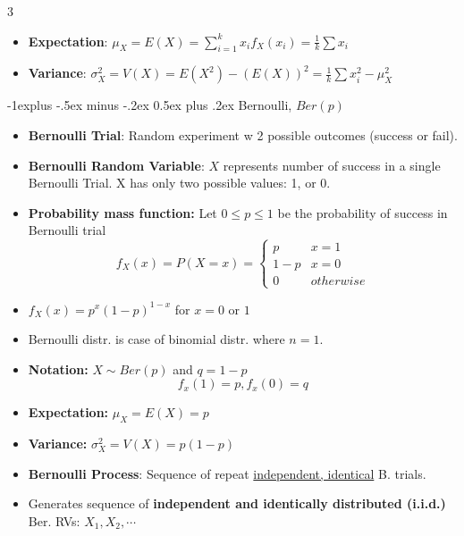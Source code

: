 \documentclass[8pt, a4paper, landscape]{article}
\makeatletter
\renewcommand{\subsection}{\@startsection{subsection}{2}{0.1mm}%
                                {-1explus -.5ex minus -.2ex}%
                                {0.5ex plus .2ex}%
                                {\normalfont\normalsize\bfseries}}
\makeatother
\begin{document}
\begin{multicols*}{3}
\begin{itemize}
    \[
f(x)
    \begin{cases*}
        \frac{1}{k}, & for $x = x_1, x_2, ..., x_k$ \\
        0, & otherwise\\
    \end{cases*}
\]
 
    \item \textbf{Expectation}: $\mu_X = E(X) = \sum_{i = 1} ^{k} x_i f_X (x_i) = \frac{1}{k} \sum x_i$
    \item \textbf{Variance}: $\sigma_X^2 = V(X) = E(X^2) - (E(X))^2 = \frac{1}{k} \sum x_i^2 - \mu_X^2$
\end{itemize}

\subsection{Bernoulli, $Ber(p)$}

\begin{itemize}
    \item \textbf{Bernoulli Trial}: Random experiment w 2 possible outcomes (success or fail).
    \item \textbf{Bernoulli Random Variable}: $X$ represents number of success in a single Bernoulli Trial. X has only two possible values: 1, or 0.
    \item \textbf{Probability mass function:} Let $0 \leq p \leq 1$ be the probability of success in Bernoulli trial
    \[ f_X (x) = P(X = x) = 
    \begin{cases}
        p & x = 1\\
        1 - p & x = 0\\
        0 & otherwise
    \end{cases}
    \]
    \item $f_X (x) = p^x (1-p)^{1-x}$ for $x=0$ or $1$
    \item Bernoulli distr. is case of binomial distr. where $n = 1$.
    \item \textbf{Notation:} $X \sim Ber(p)$ and $q = 1 - p$ \\
    \[ f_x(1) = p, f_x(0) = q \]
    \item \textbf{Expectation:} $\mu_X = E(X) = p$ 
    \item \textbf{Variance:} $\sigma_X^2 = V(X) = p(1-p)$
    
    \item \textbf{Bernoulli Process}: Sequence of repeat \underline{independent, identical} B. trials.
    \item Generates sequence of \textbf{independent and identically distributed (i.i.d.)} Ber. RVs: $X_1, X_2, \cdots$
\end{itemize}



\end{multicols*}
\end{document}
